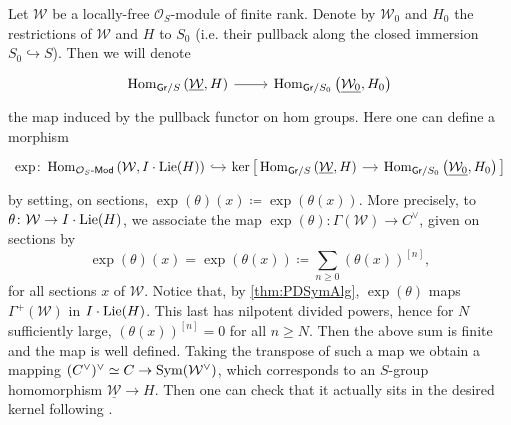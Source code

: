 \begin{defn}
	Let $\mathcal{W}$ be a locally-free $\mathcal{O}_{ S }$-module of finite rank.
	Denote by $\mathcal{W}_0$ and $H_0$ the restrictions of $\mathcal{W}$ and $H$ to 
	$S_0$ (i.e. their pullback along
	the closed immersion $S_0 \hookrightarrow S$).
	Then we will denote
	\begin{equation*}
	\begin{tikzcd}[row sep = 0ex
		,/tikz/column 1/.append style={anchor=base east}
		,/tikz/column 2/.append style={anchor=base west}]
		\Hom_{ \mathsf{Gr}/S } 
		\left( \underline{\mathcal{W}}, H \right)
		\arrow[r, "", rightarrow] &
		\Hom_{ \mathsf{Gr}/S_0 }
		\left( \underline{\mathcal{W}_0}, H_0 \right)
	\end{tikzcd}
	\end{equation*} 
	the map induced by the pullback functor on hom groups.
	Here one can define a morphism
	\begin{equation*}
	\begin{tikzcd}[row sep = 0ex, column sep = 1.14em
		,/tikz/column 1/.append style={anchor=base east}
		,/tikz/column 2/.append style={anchor=base west}]
		\exp\colon
		\Hom_{ \mathcal{O}_{ S }\text{-}\mathsf{Mod} }
		\left( \mathcal{W}, I \cdot \lie(H) \right)
		\arrow[r, "", hookrightarrow] &
		\ker \big[ 
		\Hom_{ \mathsf{Gr}/S } 
		\left( \underline{\mathcal{W}}, H \right)
		\arrow[r, "", rightarrow] &
		\Hom_{ \mathsf{Gr}/S_0 }
		\left( \underline{\mathcal{W}_0}, H_0 \right)
		\big]
	\end{tikzcd}
	\end{equation*} 
	by setting, on sections,
	$\exp (\theta) (x) \coloneqq \exp \left( \theta(x) \right)$.
	More precisely, to $\theta\colon \mathcal{W} \to I \cdot \operatorname{Lie}(H)$,
	we associate the map $\exp (\theta)\colon \Gamma(\mathcal{W}) \to C^\vee$, given on sections by
	\begin{equation*}
		\exp (\theta) (x) =
	\exp \left( \theta(x) \right) \coloneqq
	\sum_{n\geq 0 } (\theta(x))^{[n]}
	,\end{equation*}
	for all sections $x$ of $\mathcal{W}$.
	Notice that, by \cref{thm:PDSymAlg}, $\exp (\theta)$
	maps $\Gamma^+(\mathcal{W})$ in $I \cdot \operatorname{Lie}(H)$.
	This last has nilpotent divided powers, hence for $N$ sufficiently
	large, $(\theta(x))^{[n]} = 0$ for all $n \geq N$.
	Then the above sum is finite
	and the map is well defined.
	Taking the transpose of such a map we obtain a mapping 
	$(C^\vee)^\vee \simeq C \to \operatorname{Sym}(\mathcal{W}^\vee)$, which corresponds
	to an $S$-group homomorphism $\underline{\mathcal{W}} \to H$.
	Then one can check that it actually sits in the desired kernel
	following \cite[Chapter III, \S2.4, \S2.6]{Messing}.
\end{defn}



